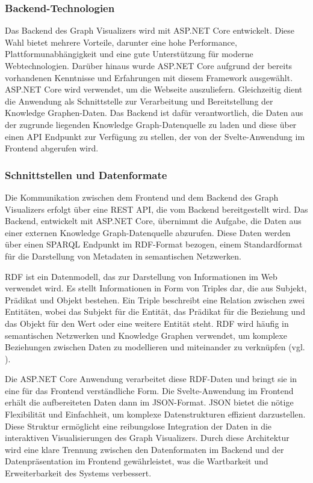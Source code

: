 \subsubsection{Backend-Technologien}

Das Backend des Graph Visualizers wird mit ASP.NET Core entwickelt. Diese Wahl bietet mehrere Vorteile, darunter eine hohe Performance, Plattformunabhängigkeit und eine gute Unterstützung für moderne Webtechnologien. Darüber hinaus wurde ASP.NET Core aufgrund der bereits vorhandenen Kenntnisse und Erfahrungen mit diesem Framework ausgewählt. ASP.NET Core wird verwendet, um die Webseite auszuliefern. Gleichzeitig dient die Anwendung als Schnittstelle zur Verarbeitung und Bereitstellung der Knowledge Graphen-Daten. Das Backend ist dafür verantwortlich, die Daten aus der zugrunde liegenden Knowledge Graph-Datenquelle zu laden und diese über einen \ac{API} Endpunkt zur Verfügung zu stellen, der von der Svelte-Anwendung im Frontend abgerufen wird.

\subsubsection{Schnittstellen und Datenformate}

Die Kommunikation zwischen dem Frontend und dem Backend des Graph Visualizers erfolgt über eine REST \ac{API}, die vom Backend bereitgestellt wird. Das Backend, entwickelt mit ASP.NET Core, übernimmt die Aufgabe, die Daten aus einer externen Knowledge Graph-Datenquelle abzurufen. Diese Daten werden über einen \ac{SPARQL} Endpunkt im \acs{RDF}-Format bezogen, einem Standardformat für die Darstellung von Metadaten in semantischen Netzwerken.

\ac{RDF} ist ein Datenmodell, das zur Darstellung von Informationen im Web verwendet wird. Es stellt Informationen in Form von Triples dar, die aus Subjekt, Prädikat und Objekt bestehen. Ein Triple beschreibt eine Relation zwischen zwei Entitäten, wobei das Subjekt für die Entität, das Prädikat für die Beziehung und das Objekt für den Wert oder eine weitere Entität steht. \ac{RDF} wird häufig in semantischen Netzwerken und Knowledge Graphen verwendet, um komplexe Beziehungen zwischen Daten zu modellieren und miteinander zu verknüpfen (vgl. \cite{rdf:W3C}).

Die ASP.NET Core Anwendung verarbeitet diese \ac{RDF}-Daten und bringt sie in eine für das Frontend verständliche Form. Die Svelte-Anwendung im Frontend erhält die aufbereiteten Daten dann im \ac{JSON}-Format. \ac{JSON} bietet die nötige Flexibilität und Einfachheit, um komplexe Datenstrukturen effizient darzustellen. Diese Struktur ermöglicht eine reibungslose Integration der Daten in die interaktiven Visualisierungen des Graph Visualizers. Durch diese Architektur wird eine klare Trennung zwischen den Datenformaten im Backend und der Datenpräsentation im Frontend gewährleistet, was die Wartbarkeit und Erweiterbarkeit des Systems verbessert.

